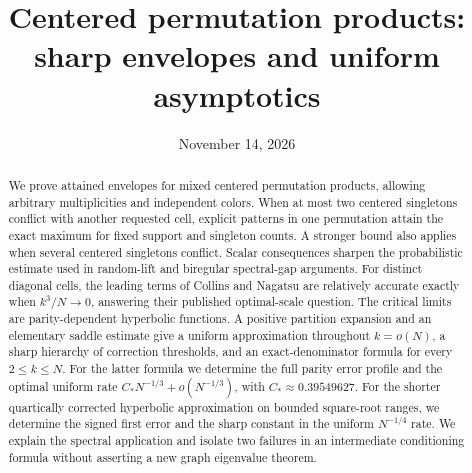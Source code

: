 \documentclass[11pt]{article}
\title{Centered permutation products:\\ sharp envelopes and uniform asymptotics}
\author{}
\date{November 14, 2026}
\theoremstyle{definition}
\theoremstyle{remark}
\newcommand{\1}{\mathbf 1}
\begin{document}
\maketitle
\begin{abstract}
We prove attained envelopes for mixed centered permutation products, allowing arbitrary multiplicities and independent colors. When at most two centered singletons conflict with another requested cell, explicit patterns in one permutation attain the exact maximum for fixed support and singleton counts. A stronger bound also applies when several centered singletons conflict. Scalar consequences sharpen the probabilistic estimate used in random-lift and biregular spectral-gap arguments. For distinct diagonal cells, the leading terms of Collins and Nagatsu are relatively accurate exactly when $k^3/N\to0$, answering their published optimal-scale question. The critical limits are parity-dependent hyperbolic functions. A positive partition expansion and an elementary saddle estimate give a uniform approximation throughout $k=o(N)$, a sharp hierarchy of correction thresholds, and an exact-denominator formula for every $2\le k\le N$. For the latter formula we determine the full parity error profile and the optimal uniform rate $C_*N^{-1/3}+o(N^{-1/3})$, with $C_*\approx0.39549627$. For the shorter quartically corrected hyperbolic approximation on bounded square-root ranges, we determine the signed first error and the sharp constant in the uniform $N^{-1/4}$ rate. We explain the spectral application and isolate two failures in an intermediate conditioning formula without asserting a new graph eigenvalue theorem.
\end{abstract}
\begingroup\small
\tableofcontents
\endgroup
\clearpage










\appendix


\end{document}
